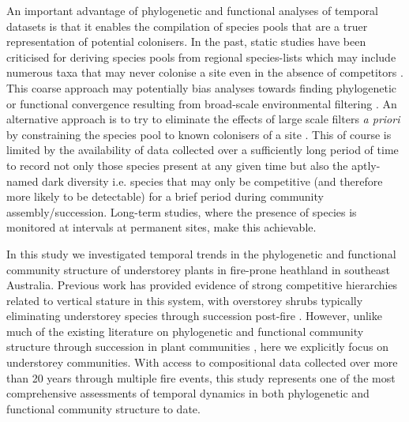 An important advantage of phylogenetic and functional analyses of temporal datasets is that it enables the compilation of species pools that are a truer representation of potential colonisers. In the past, static studies have been criticised for deriving species pools from regional species-lists which may include numerous taxa that may never colonise a site even in the absence of competitors \citep{Grime2006, DeBello2012}. This coarse approach may potentially bias analyses towards finding phylogenetic or functional convergence resulting from broad-scale environmental filtering \citep{Gotzenberger2012}. An alternative approach is to try to eliminate the effects of large scale filters \textit{a priori} by constraining the species pool to known colonisers of a site \citep{DeBello2012}. This of course is limited by the availability of data collected over a sufficiently long period of time to record not only those species present at any given time but also the aptly-named dark diversity \citep{Partel2011} i.e. species that may only be competitive (and therefore more likely to be detectable) for a brief period during community assembly/succession. Long-term studies, where the presence of species is monitored at intervals at permanent sites, make this achievable.

In this study we investigated temporal trends in the phylogenetic and functional community structure of understorey plants in fire-prone heathland in southeast Australia. Previous work has provided evidence of strong competitive hierarchies related to vertical stature in this system, with overstorey shrubs typically eliminating understorey species through succession post-fire \citep{Keith1994, Tozer2003, KEITH2007}. However, unlike much of the existing literature on phylogenetic and functional community structure through succession in plant communities \citep[e.g.][]{Letcher2010,Norden2012, Kunstler2012, Bhaskar2014}, here we explicitly focus on understorey communities. With access to compositional data collected over more than 20 years through multiple fire events, this study represents one of the most comprehensive assessments of temporal dynamics in both phylogenetic and functional community structure to date. 

